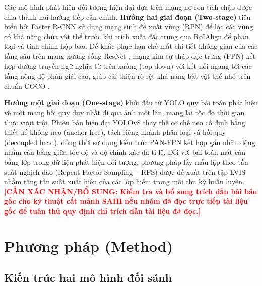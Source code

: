 \documentclass[11pt]{article}
\newcommand{\needconfirm}[1]{\textcolor{red}{\textbf{[CẦN XÁC NHẬN/BỔ SUNG: #1]}}}
\begin{document}
Các mô hình phát hiện đối tượng hiện đại dựa trên mạng nơ-ron tích chập được chia thành hai hướng tiếp cận chính. \textbf{Hướng hai giai đoạn (Two-stage)} tiêu biểu bởi Faster R-CNN \citep{ren2015faster} sử dụng mạng sinh đề xuất vùng (RPN) để lọc các vùng có khả năng chứa vật thể trước khi trích xuất đặc trưng qua RoIAlign để phân loại và tinh chỉnh hộp bao. Để khắc phục hạn chế mất chi tiết không gian của các tầng sâu trên mạng xương sống ResNet \citep{he2016resnet}, mạng kim tự tháp đặc trưng (FPN) \citep{lin2017fpn} kết hợp đường truyền ngữ nghĩa từ trên xuống (top-down) với kết nối ngang tới các tầng nông độ phân giải cao, giúp cải thiện rõ rệt khả năng bắt vật thể nhỏ trên chuẩn COCO \citep{lin2014coco}.

\textbf{Hướng một giai đoạn (One-stage)} khởi đầu từ YOLO \citep{redmon2016you} quy bài toán phát hiện về một mạng hồi quy duy nhất đi qua ảnh một lần, mang lại tốc độ thời gian thực vượt trội. Phiên bản hiện đại YOLOv8 \citep{jocher2023ultralytics} thay thế cơ chế neo cố định bằng thiết kế không neo (anchor-free), tách riêng nhánh phân loại và hồi quy (decoupled head), đồng thời sử dụng kiến trúc PAN-FPN kết hợp gán nhãn động nhằm cân bằng giữa tốc độ và độ chính xác đa tỉ lệ. Đối với bài toán mất cân bằng lớp trong dữ liệu phát hiện đối tượng, phương pháp lấy mẫu lặp theo tần suất nghịch đảo (Repeat Factor Sampling -- RFS) được đề xuất trên tập LVIS \citep{gupta2019lvis} nhằm tăng tần suất xuất hiện của các lớp hiếm trong mỗi chu kỳ huấn luyện. \needconfirm{Kiểm tra và bổ sung trích dẫn bài báo gốc cho kỹ thuật cắt mảnh SAHI nếu nhóm đã đọc trực tiếp tài liệu gốc để tuân thủ quy định chỉ trích dẫn tài liệu đã đọc.}


\section{Phương pháp (Method)}

\subsection{Kiến trúc hai mô hình đối sánh}
\end{document}
